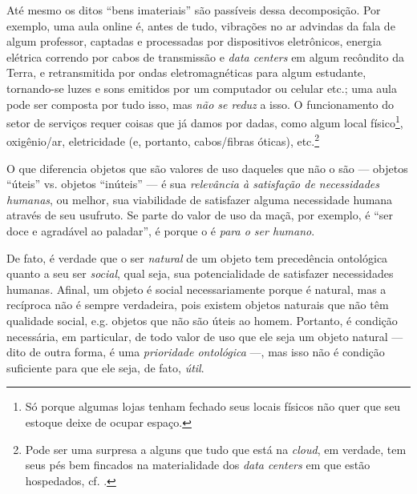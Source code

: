 \documentclass[12pt]{article}
\begin{document}
Até mesmo os ditos ``bens imateriais'' são passíveis dessa decomposição. Por exemplo, uma aula online é, antes de tudo, vibrações no ar advindas da fala de algum professor, captadas e processadas por dispositivos eletrônicos, energia elétrica correndo por cabos de transmissão e \textit{data centers} em algum recôndito da Terra, e retransmitida por ondas eletromagnéticas para algum estudante, tornando-se luzes e sons emitidos por um computador ou celular etc.; uma aula pode ser composta por tudo isso, mas \textit{não se reduz} a isso. O funcionamento do setor de serviços requer coisas que já damos por dadas, como algum local físico\footnote{Só porque algumas lojas tenham fechado seus locais físicos não quer que seu estoque deixe de ocupar espaço.}, oxigênio/ar, eletricidade (e, portanto, cabos/fibras óticas), etc.\footnote{Pode ser uma surpresa a alguns que tudo que está na \textit{cloud}, em verdade, tem seus pés bem fincados na materialidade dos \textit{data centers} em que estão hospedados, cf. \parencite{Monserrate2022}.}


O que diferencia objetos que são valores de uso daqueles que não o são --- objetos ``úteis'' vs. objetos ``inúteis'' --- é sua \textit{relevância à satisfação de necessidades humanas}, ou melhor, sua viabilidade de satisfazer alguma necessidade humana através de seu usufruto. Se parte do valor de uso da maçã, por exemplo, é ``ser doce e agradável ao paladar'', é porque o é \textit{para o ser humano}. 

De fato, é verdade que o ser \textit{natural} de um objeto tem precedência ontológica quanto a seu ser \textit{social}, qual seja, sua potencialidade de satisfazer necessidades humanas. Afinal, um objeto é social necessariamente porque é natural, mas a recíproca não é sempre verdadeira, pois existem objetos naturais que não têm qualidade social, e.g. objetos que não são úteis ao homem. Portanto, é condição necessária, em particular, de todo valor de uso que ele seja um objeto natural --- dito de outra forma, é uma \textit{prioridade ontológica} ---, mas isso não é condição suficiente para que ele seja, de fato, \textit{útil}. 
\end{document}
